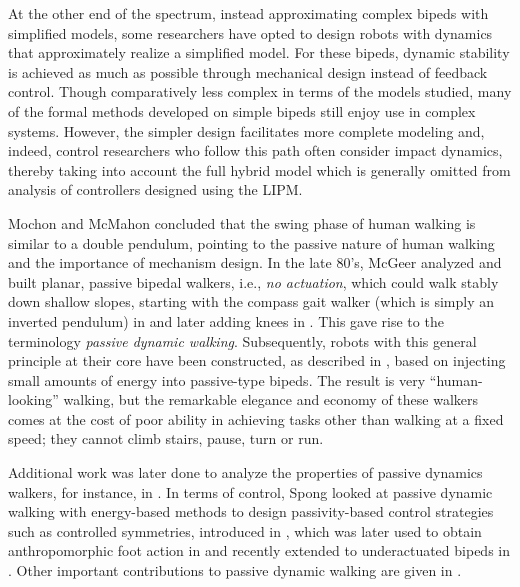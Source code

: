 At the other end of the spectrum, instead approximating complex bipeds with
simplified models, some researchers have opted to design robots with dynamics
that approximately realize a simplified model.
%
For these bipeds, dynamic stability is achieved as much as possible through
mechanical design instead of feedback control.
%
Though comparatively less complex in terms of the models studied, many of the
formal methods developed on simple bipeds still enjoy use in complex systems.
%
However, the simpler design facilitates more complete modeling and, indeed,
control researchers who follow this path often consider impact dynamics, thereby
taking into account the full hybrid model which is generally omitted from
analysis of controllers designed using the LIPM.
%

Mochon and McMahon \cite{Mochon1980} concluded that the swing phase of human
walking is similar to a double pendulum, pointing to the passive nature of human
walking and the importance of mechanism design.
%
In the late 80's, McGeer analyzed and built planar, passive bipedal walkers,
i.e., {\em no actuation}, which could walk stably down shallow slopes, starting
with the compass gait walker (which is simply an inverted pendulum) in
\cite{McGeer1990} and later adding knees in \cite{McGeer1990a}.
%
This gave rise to the terminology {\em passive dynamic walking}.
%
Subsequently, robots with this general principle at their core have been
constructed, as described in \cite{Collins2005}, based on injecting small
amounts of energy into passive-type bipeds.
%
The result is very ``human-looking'' walking, but the remarkable elegance and
economy of these walkers comes at the cost of poor ability in achieving tasks
other than walking at a fixed speed;
%
they cannot climb stairs, pause, turn or run.
%

Additional work was later done to analyze the properties of passive dynamics
walkers, for instance, in \cite{Espiau1994, Garcia1998, Borzova2004}.
%
In terms of control, Spong \cite{Spong1999} looked at passive dynamic walking with
energy-based methods to design passivity-based control strategies such as
controlled symmetries, introduced in \cite{Spong2005}, which was later used to
obtain anthropomorphic foot action in \cite{Sinnet2009, Sinnet2009a} and recently
extended to underactuated bipeds in \cite{Hu2011}.
Other important contributions to passive dynamic walking are given in
\cite{Kuo1999, Kuo2002, Anderson2005, Wisse2007}.
%

